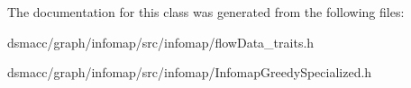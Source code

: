 The documentation for this class was generated from the following files\+:\begin{DoxyCompactItemize}
\item 
dsmacc/graph/infomap/src/infomap/flow\+Data\+\_\+traits.\+h\item 
dsmacc/graph/infomap/src/infomap/Infomap\+Greedy\+Specialized.\+h\end{DoxyCompactItemize}
